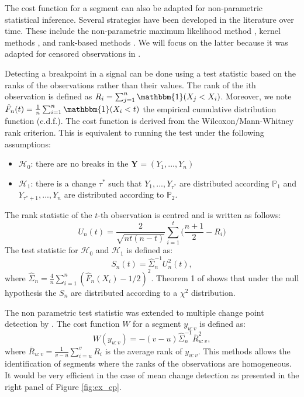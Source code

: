 The cost function for a segment can also be adapted for non-parametric statistical inference. Several strategies have been developed in the literature over time. These include the non-parametric maximum likelihood method \citep{Zou2014,Einmahl2003}, kernel methods \citep{Harchaoui2008,li2015m}, and rank-based methods \citep{Pettitt1980,Wang2019}. We will focus on the latter because it was adapted for censored observations in \cite{lung2015}.  

Detecting a breakpoint in a signal can be done using a test statistic based on the ranks of the observations rather than their values. The rank of the ith observation is defined as $R_i = \sum_{j =1}^n\mathbbm{1}(X_j < X_i)$. Moreover, we note $\hat{F}_n(t) = \frac{1}{n}\sum_{i = 1}^n\mathbbm{1}(X_i < t)$ the empirical cumulative distribution function (c.d.f.). The cost function is derived from the Wilcoxon/Mann-Whitney rank criterion. This is equivalent to running the test under the following assumptions: 
\begin{itemize}
  \item $\mathcal{H}_0$: there are no breaks in the $\bm Y = (Y_1,...,Y_n)$ 
  \item $\mathcal{H}_1$: there is a change $\tau^*$ such that $Y_1,...,Y_{\tau^*}$ are distributed according $\mathbb{P}_1$ and $Y_{\tau^*+1},...,Y_{n}$ are distributed according to $\mathbb{P}_2$. 
\end{itemize}
The rank statistic of the $t$-th observation is centred and is written as follows:
\begin{equation}\label{chp2:statranknp}
  U_n(t) = \frac{2}{\sqrt{nt(n-t)}}\sum_{i = 1}^{t}\bigg(\frac{n+1}{2} - R_i\bigg)
\end{equation}
The test statistic for $\mathcal{H}_0$ and $\mathcal{H}_1$ is defined as:
\begin{equation}\label{chp2:stattestnp}
  S_n(t) = \hat{\Sigma}_n^{-1} U^2_n(t),
\end{equation}
where $\hat{\Sigma}_n = \frac{4}{n}\sum_{i=1}^n(\hat{F}_n(X_i)-1/2)^2$. Theorem 1 of \cite{lung2015} shows that under the null hypothesis the $S_n$ are distributed according to a $\chi^2$ distribution.

The non parametric test statistic was extended to multiple change point detection by \cite{lung2015}. The cost function $W$ for a segment $y_{u:v}$ is defined as: 
\begin{equation}\label{chp2:costfuncnp}
  W(y_{u:v}) = -(v-u)\hat{\Sigma}^{-1}_n\overline{R}^2_{u:v},
\end{equation}
where $\overline{R}_{u:v} = \frac{1}{v-u}\sum_{i = u}^vR_i$ is the average rank of $y_{u:v}$.
This methods allows the identification of segments where the ranks of the observations are homogeneous. It would be very efficient in the case of mean change detection as presented in the right panel of Figure \ref{fig:ex_cp}.  

